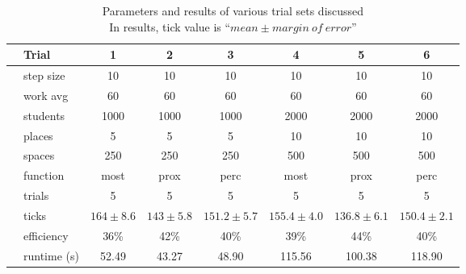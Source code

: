 \documentclass[11pt]{article} %
\begin{document}

\begin{table}[]
\footnotesize
\centering
\begin{tabular}{l|l|ccc|ccc}
 & Trial & 1 & 2 & 3 & 4 & 5 & 6  \\ \hline
  \parbox[t]{2mm}{} 
 & step size 	& 10  			& 10  			& 10 			& 10 					& 10 				& 10  \\
 & work avg 	& 60 			&  60 			& 60			& 60 					& 60 				& 60 \\
 & students 	& 1000 			& 1000 			& 1000 			& 2000 					& 2000 				& 2000 \\
 & places 		& 5 			& 5 			& 5 			& 10 					& 10 				& 10 \\
 & spaces 		& 250 			& 250 			& 250 			& 500 					& 500 				& 500 \\
 & function 	& most 			& prox 			& perc 			& most 					& prox 				& perc \\
 & trials 		& 5 			& 5 			& 5 			& 5 					& 5 				& 5 \\ \hline
\parbox[t]{2mm}{} 
 & ticks 		& $164\pm 8.6$ 	& $143\pm 5.8$ 	& $151.2\pm 5.7$	& $155.4\pm 4.0$	& $136.8\pm 6.1$	& $150.4\pm 2.1$ \\
 & efficiency 	& 36\%			& 42\%			& 40\%				& 39\%				& 44\%				& 40\% \\
 & runtime (s) 	& 52.49			& 43.27			& 48.90				& 115.56			& 100.38			& 118.90
\end{tabular}
\caption{Parameters and results of various trial sets discussed \\ \footnotesize In results, tick value is ``$mean \pm margin \: of \: error$''}
\end{table}



\end{document}
